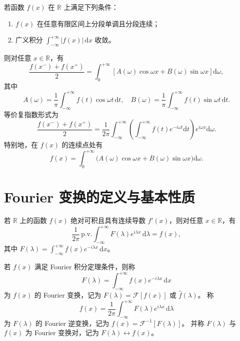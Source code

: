 \begin{theorem}
  若函数 $f(x)$ 在 $\mathbb R$ 上满足下列条件：
  \begin{enumerate}
    \item $f(x)$ 在任意有限区间上分段单调且分段连续；
    \item 广义积分 $\displaystyle\int_{-\infty}^{+\infty}|f(x)|\,\mathrm{d}x$ 收敛。
  \end{enumerate}
  则对任意 $x\in\mathbb R$，有
  \[
  \frac{f(x^-)+f(x^+)}{2}
  =\int_{0}^{+\infty}\left[A(\omega)\cos\omega x + B(\omega)\sin\omega x\right]\mathrm{d}\omega,
  \]
  其中
  \[
  A(\omega)=\frac{1}{\pi}\int_{-\infty}^{+\infty}f(t)\cos\omega t\,\mathrm{d}t,\quad
  B(\omega)=\frac{1}{\pi}\int_{-\infty}^{+\infty}f(t)\sin\omega t\,\mathrm{d}t.
  \]
  等价复指数形式为
  \[
  \frac{f(x^-)+f(x^+)}{2}
  =\frac{1}{2\pi}\int_{-\infty}^{+\infty}\left(\int_{-\infty}^{+\infty}f(t)e^{-i\omega t}\mathrm{d}t\right)
  e^{i\omega x}\mathrm{d}\omega.
  \]
  特别地，在 $f(x)$ 的连续点处有
  \[
  f(x)=\int_{0}^{+\infty}\big(A(\omega)\cos\omega x+B(\omega)\sin\omega x\big)\mathrm{d}\omega.
  \]
\end{theorem}

\section{Fourier 变换的定义与基本性质}

\begin{theorem}
  若 $\mathbb{R}$ 上的函数 $f(x)$ 绝对可积且具有连续导数 $f'(x)$，则对任意 $x\in\mathbb{R}$，有
  \[
  \frac{1}{2\pi}\,\mathrm{p.v.}\int_{-\infty}^{+\infty}F(\lambda)e^{i\lambda x}\,\mathrm{d}\lambda=f(x),
  \]
  其中 $F(\lambda)=\displaystyle\int_{-\infty}^{+\infty}f(x)e^{-i\lambda x}\,\mathrm{d}x$。
\end{theorem}

\begin{definition}
  若 $f(x)$ 满足 Fourier 积分定理条件，则称
  \[
  F(\lambda)=\int_{-\infty}^{+\infty}f(x)e^{-i\lambda x}\,\mathrm{d}x
  \]
  为 $f(x)$ 的 Fourier 变换，记为 $F(\lambda)=\mathcal{F}[f(x)]$ 或 $\hat{f}(\lambda)$。
  称
  \[
  f(x)=\frac{1}{2\pi}\int_{-\infty}^{+\infty}F(\lambda)e^{i\lambda x}\,\mathrm{d}\lambda
  \]
  为 $F(\lambda)$ 的 Fourier 逆变换，记为 $f(x)=\mathcal{F}^{-1}[F(\lambda)]$。
  并称 $F(\lambda)$ 与 $f(x)$ 为 Fourier 变换对，记为 $F(\lambda)\leftrightarrow f(x)$。
\end{definition}

